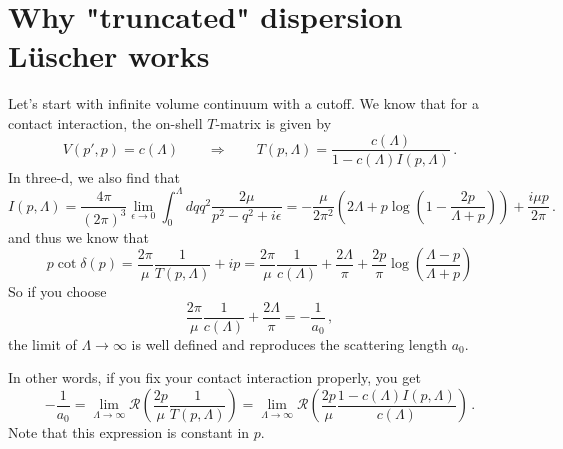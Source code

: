 \documentclass[aps,superscriptaddress,tightenlines,nofootinbib,floatfix,longbibliography,notitlepage]{revtex4-1}
\begin{document}
\section{Why "truncated" dispersion Lüscher works}

Let's start with infinite volume continuum with a cutoff.
We know that for a contact interaction, the on-shell $T$-matrix is given by
\begin{equation}
	V(p', p) = c(\Lambda) \qquad \Rightarrow \qquad
	T(p, \Lambda) = \frac{c(\Lambda)}{1 - c(\Lambda) I(p, \Lambda)} \, .
\end{equation}
In three-d, we also find that
\begin{equation}
	I(p, \Lambda)
	=
	\frac{4 \pi}{(2\pi)^3} \lim_{\epsilon \to 0}\int_{0}^{\Lambda} d q q^2 \frac{2 \mu}{p^2 - q^2 + i \epsilon}
	=
	-\frac{\mu}{2\pi^2}   \left(2 \Lambda +p \log \left(1-\frac{2 p}{\Lambda +p}\right)\right) + \frac{i \mu p}{2 \pi}
	\, .
\end{equation}
and thus we know that
\begin{equation}
	p \cot \delta(p) 
	= \frac{2 \pi}{\mu}\frac{1}{T(p, \Lambda)} + i p
	= \frac{2 \pi}{\mu} \frac{1}{c(\Lambda)} + \frac{2 \Lambda}{\pi} + \frac{2 p}{\pi} \log \left( \frac{\Lambda - p}{\Lambda + p}\right)
\end{equation}
So if you choose
\begin{equation}
	\frac{2 \pi}{\mu} \frac{1}{c(\Lambda)} + \frac{2 \Lambda}{\pi} = - \frac{1}{a_0} \, ,
\end{equation}
the limit of $\Lambda \to \infty$ is well defined and reproduces the scattering length $a_0$.

In other words, if you fix your contact interaction properly, you get
\begin{equation}
	- \frac{1}{a_0}
	=
	\lim\limits_{\Lambda \to \infty} \mathcal R \left( \frac{2 p}{\mu} \frac{1}{T(p, \Lambda)} \right)
	=
	\lim\limits_{\Lambda \to \infty} \mathcal R \left(\frac{2 p}{\mu}   \frac{1 - c(\Lambda) I(p, \Lambda)}{c(\Lambda)} \right)
	\, .
\end{equation}
Note that this expression is constant in $p$.
\end{document}
